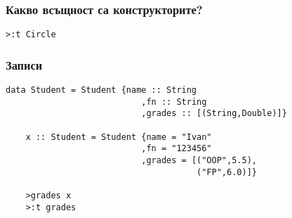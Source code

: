 \documentclass{beamer}
\begin{document}
\begin{frame}[fragile]
  \frametitle{Какво всъщност са конструкторите?}

  \begin{lstlisting}[basicstyle=\small]
    >:t Circle
  \end{lstlisting}

\end{frame}


\begin{frame}[fragile]
  \frametitle{Записи}

  \begin{lstlisting}[basicstyle=\small]
    data Student = Student {name :: String
                           ,fn :: String
                           ,grades :: [(String,Double)]}

    x :: Student = Student {name = "Ivan"
                           ,fn = "123456"
                           ,grades = [("OOP",5.5),
                                      ("FP",6.0)]}                           

    >grades x
    >:t grades
  \end{lstlisting}

\end{frame}
\end{document}
